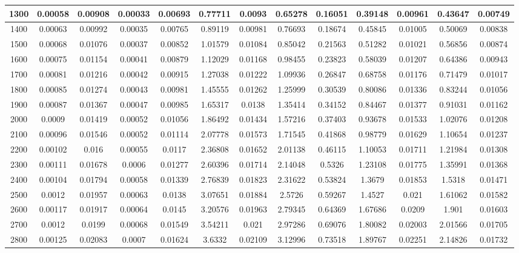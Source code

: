 \documentclass[conference]{IEEEtran}
\begin{document}
\begin{table}[!ht]
\begin{tabular}{|c|c|c|c|c|c|c|c|c|c|c|c|c|}
\hline
1300 & 0.00058 & 0.00908 & 0.00033 & 0.00693 & 0.77711 & 0.0093 & 0.65278 & 0.16051 &0.39148 & 0.00961 & 0.43647 & 0.00749 \\
\hline
1400 & 0.00063 & 0.00992 & 0.00035 & 0.00765 & 0.89119 & 0.00981 & 0.76693 & 0.18674 &0.45845 & 0.01005 & 0.50069 & 0.00838 \\
\hline
1500 & 0.00068 & 0.01076 & 0.00037 & 0.00852 & 1.01579 & 0.01084 & 0.85042 & 0.21563 &0.51282 & 0.01021 & 0.56856 & 0.00874 \\
\hline
1600 & 0.00075 & 0.01154 & 0.00041 & 0.00879 & 1.12029 & 0.01168 & 0.98455 & 0.23823 &0.58039 & 0.01207 & 0.64386 & 0.00943 \\
\hline
1700 & 0.00081 & 0.01216 & 0.00042 & 0.00915 & 1.27038 & 0.01222 & 1.09936 & 0.26847 &0.68758 & 0.01176 & 0.71479 & 0.01017 \\
\hline
1800 & 0.00085 & 0.01274 & 0.00043 & 0.00981 & 1.45555 & 0.01262 & 1.25999 & 0.30539 &0.80086 & 0.01336 & 0.83244 & 0.01056 \\
\hline
1900 & 0.00087 & 0.01367 & 0.00047 & 0.00985 & 1.65317 & 0.0138 & 1.35414 & 0.34152 &0.84467 & 0.01377 & 0.91031 & 0.01162 \\
\hline
2000 & 0.0009 & 0.01419 & 0.00052 & 0.01056 & 1.86492 & 0.01434 & 1.57216 & 0.37403 &0.93678 & 0.01533 & 1.02076 & 0.01208 \\
\hline
2100 & 0.00096 & 0.01546 & 0.00052 & 0.01114 & 2.07778 & 0.01573 & 1.71545 & 0.41868 &0.98779 & 0.01629 & 1.10654 & 0.01237 \\
\hline
2200 & 0.00102 & 0.016 & 0.00055 & 0.0117 & 2.36808 & 0.01652 & 2.01138 & 0.46115 &1.10053 & 0.01711 & 1.21984 & 0.01308 \\
\hline
2300 & 0.00111 & 0.01678 & 0.0006 & 0.01277 & 2.60396 & 0.01714 & 2.14048 & 0.5326 &1.23108 & 0.01775 & 1.35991 & 0.01368 \\
\hline
2400 & 0.00104 & 0.01794 & 0.00058 & 0.01339 & 2.76839 & 0.01823 & 2.31622 & 0.53824 &1.3679 & 0.01853 & 1.5318 & 0.01471 \\
\hline
2500 & 0.0012 & 0.01957 & 0.00063 & 0.0138 & 3.07651 & 0.01884 & 2.5726 & 0.59267 &1.4527 & 0.021 & 1.61062 & 0.01582 \\
\hline
2600 & 0.00117 & 0.01917 & 0.00064 & 0.0145 & 3.20576 & 0.01963 & 2.79345 & 0.64369 &1.67686 & 0.0209 & 1.901 & 0.01603 \\
\hline
2700 & 0.0012 & 0.0199 & 0.00068 & 0.01549 & 3.54211 & 0.021 & 2.97286 & 0.69076 &1.80082 & 0.02003 & 2.01566 & 0.01705 \\
\hline
2800 & 0.00125 & 0.02083 & 0.0007 & 0.01624 & 3.6332 & 0.02109 & 3.12996 & 0.73518 &1.89767 & 0.02251 & 2.14826 & 0.01732 \\

\end{tabular}
\end{table}
\end{document}
